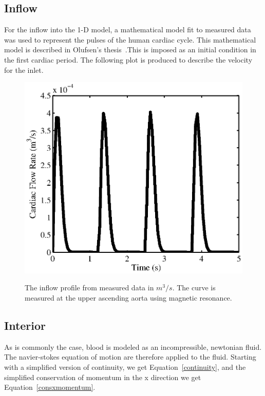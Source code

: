\documentclass[12pt]{article}
\begin{document}
\subsection{Inflow}

For the inflow into the 1-D model, a mathematical model fit to measured data was used to represent the pulses of the human cardiac cycle. This mathematical model is described in Olufsen's thesis~\cite{olufsenthesis}.This is imposed as an initial condition in the first cardiac period. The following plot is produced to describe the velocity for the inlet.

\begin{figure}[ht]
	\centering
	\includegraphics{inflow}
	\label{inflower}
	\caption{The inflow profile from measured data in $m^3/s$. The curve is measured at the upper ascending aorta using magnetic resonance.}
\end{figure}


\subsection{Interior}
As is commonly the case, blood is modeled as an incompressible, newtonian fluid. The navier-stokes equation of motion are therefore applied to the fluid. Starting with a simplified version of continuity, we get Equation~\eqref{continuity}, and the simplified conservation of momentum in the x direction we get Equation~\eqref{consxmomentum}.
\end{document}
